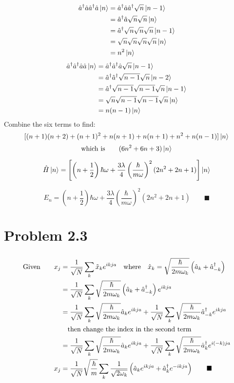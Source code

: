 \documentclass{amsart}
\begin{document}
\begin{align*}
    \hat{a}^\dagger\hat{a}\hat{a}^\dagger\hat{a}\ket{n}&=\hat{a}^\dagger\hat{a}\hat{a}^\dagger\sqrt{n}\ket{n-1}\\
    &=\hat{a}^\dagger\hat{a}\sqrt{n}\sqrt{n}\ket{n}\\
    &=\hat{a}^\dagger\sqrt{n}\sqrt{n}\sqrt{n}\ket{n-1}\\
    &=\sqrt{n}\sqrt{n}\sqrt{n}\sqrt{n}\ket{n}\\
    &=n^2\ket{n}
\end{align*}
\begin{align*}
    \hat{a}^\dagger\hat{a}^\dagger\hat{a}\hat{a}\ket{n}&=\hat{a}^\dagger\hat{a}^\dagger\hat{a}\sqrt{n}\ket{n-1}\\
    &=\hat{a}^\dagger\hat{a}^\dagger\sqrt{n-1}\sqrt{n}\ket{n-2}\\
    &=\hat{a}^\dagger\sqrt{n-1}\sqrt{n-1}\sqrt{n}\ket{n-1}\\
    &=\sqrt{n}\sqrt{n-1}\sqrt{n-1}\sqrt{n}\ket{n}\\
    &=n(n-1)\ket{n}
\end{align*}
Combine the six terms to find:
\[[(n+1)(n+2)+(n+1)^2+n(n+1)+n(n+1)+n^2+n(n-1)]\ket{n}\]
\[\text{which is}\qquad(6n^2+6n+3)\ket{n}\]

\[\hat{H}\ket{n}=\left[\left(n+\frac{1}{2}\right)\hbar\omega+\frac{3\lambda}{4}\left(\frac{\hbar}{m\omega}\right)^2(2n^2+2n+1)\right]\ket{n}\]

\[E_n=\left(n+\frac{1}{2}\right)\hbar\omega+\frac{3\lambda}{4}\left(\frac{\hbar}{m\omega}\right)^2(2n^2+2n+1)\qquad\blacksquare\]

\section*{Problem 2.3}
\[\]
\begin{align*}
    \text{Given}\qquad x_j&=\frac{1}{\sqrt{N}}\sum_k \tilde{x}_k e^{ikja}\qq{where} \hat{x}_k=\sqrt{\frac{\hbar}{2m\omega_k}}\left(\hat{a}_k+\hat{a}^\dagger_{-k}\right)\\
    &=\frac{1}{\sqrt{N}}\sum_k \sqrt{\frac{\hbar}{2m\omega_k}}\left(\hat{a}_k+\hat{a}^\dagger_{-k}\right) e^{ikja}\\
    &=\frac{1}{\sqrt{N}}\sum_k \sqrt{\frac{\hbar}{2m\omega_k}}\hat{a}_k e^{ikja}+\frac{1}{\sqrt{N}}\sum_k \sqrt{\frac{\hbar}{2m\omega_k}}\hat{a}^\dagger_{-k} e^{ikja}\\
    &\qq{then change the index in the second term}\\
    &=\frac{1}{\sqrt{N}}\sum_k \sqrt{\frac{\hbar}{2m\omega_k}}\hat{a}_k e^{ikja}+\frac{1}{\sqrt{N}}\sum_k \sqrt{\frac{\hbar}{2m\omega_{k}}}\hat{a}^\dagger_{k} e^{i(-k)ja}\\
    x_j&=\frac{1}{\sqrt{N}}\sqrt{\frac{\hbar}{m}}\sum_k \frac{1}{\sqrt{2\omega_k}}\left(\hat{a}_k e^{ikja}+\hat{a}^\dagger_{k} e^{-ikja}\right)\qquad\blacksquare
\end{align*}
\end{document}
